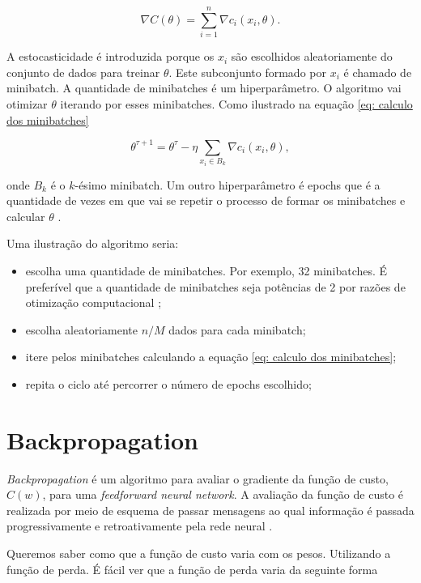 \documentclass[12pt,titlepage]{article}
\begin{document}
\begin{equation}
	\nabla C(\theta) = \sum_{i=1}^n \nabla c_i(x_i,\theta).
\end{equation}

A estocasticidade é introduzida porque os $x_i$ são escolhidos aleatoriamente do conjunto de dados para treinar $\theta$. Este subconjunto formado por $x_i$ é chamado de minibatch. A quantidade de minibatches é um hiperparâmetro. O algoritmo vai otimizar $\theta$ iterando por esses minibatches. Como ilustrado na equação \ref{eq: calculo dos minibatches}

\begin{equation}
	\label{eq: calculo dos minibatches}
	\theta^{\tau+1} = \theta^\tau - \eta \sum_{x_i \in B_k} \nabla c_i(x_i,\theta),
\end{equation}

onde $B_k$ é o $k$-ésimo minibatch. Um outro hiperparâmetro é epochs que é a quantidade de vezes em que vai se repetir o processo de formar os minibatches e calcular $\theta$ \cite{Morten2021}.

Uma ilustração do algoritmo seria:
\begin{itemize}
	\item escolha uma quantidade de minibatches. Por exemplo, 32 minibatches. É preferível que a quantidade de minibatches seja potências de 2 por razões de otimização computacional \cite{Morten2021};
	\item escolha aleatoriamente $n/M$ dados para cada minibatch;
	\item itere pelos minibatches calculando a equação \eqref{eq: calculo dos minibatches};
	\item repita o ciclo até percorrer o número de epochs escolhido;
\end{itemize}

\section{Backpropagation}

\textit{Backpropagation} é um algoritmo para avaliar o gradiente da função de custo, $C(w)$, para uma \textit{feedforward neural network}. A avaliação da função de custo é realizada por meio de esquema de passar mensagens ao qual informação é passada progressivamente e retroativamente pela rede neural \cite{bishop2006}.

Queremos saber como que a função de custo varia com os pesos. Utilizando a função de perda. É fácil ver que a função de perda varia da seguinte forma
\end{document}
